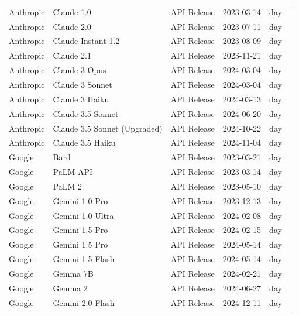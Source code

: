\documentclass[sigconf]{acmart}
\begin{document}
\begin{longtable}{p{2.2cm} p{3.4cm} p{3.0cm} p{2.3cm} p{1.6cm} p{2.0cm}}
Anthropic & Claude 1.0 & API Release & 2023-03-14 & day & \cite{anthropic_introducing_claude_2023} \\
Anthropic & Claude 2.0 & API Release & 2023-07-11 & day & \cite{anthropic_claude2_2023} \\
Anthropic & Claude Instant 1.2 & API Release & 2023-08-09 & day & \cite{anthropic_claude_instant_1_2_2023} \\
Anthropic & Claude 2.1 & API Release & 2023-11-21 & day & \cite{anthropic_claude2_1_2023} \\
Anthropic & Claude 3 Opus & API Release & 2024-03-04 & day & \cite{anthropic_claude3_family_2024} \\
Anthropic & Claude 3 Sonnet & API Release & 2024-03-04 & day & \cite{anthropic_claude3_family_2024} \\
Anthropic & Claude 3 Haiku & API Release & 2024-03-13 & day & \cite{anthropic_claude3_haiku_2024} \\
Anthropic & Claude 3.5 Sonnet & API Release & 2024-06-20 & day & \cite{anthropic_claude3_5_sonnet_2024} \\
Anthropic & Claude 3.5 Sonnet (Upgraded) & API Release & 2024-10-22 & day & \cite{anthropic_3_5_models_computer_use_2024} \\
Anthropic & Claude 3.5 Haiku & API Release & 2024-11-04 & day & \cite{anthropic_3_5_models_computer_use_2024} \\

Google & Bard & API Release & 2023-03-21 & day & \cite{google_bard_launch_2023} \\
Google & PaLM API & API Release & 2023-03-14 & day & \cite{google_palm_api_makersuite_2023} \\
Google & PaLM 2 & API Release & 2023-05-10 & day & \cite{google_palm2_2023} \\
Google & Gemini 1.0 Pro & API Release & 2023-12-13 & day & \cite{google_gemini_api_devs_2023} \\
Google & Gemini 1.0 Ultra & API Release & 2024-02-08 & day & \cite{google_gemini_next_era_2024} \\
Google & Gemini 1.5 Pro & API Release & 2024-02-15 & day & \cite{google_gemini_1_5_preview_2024} \\
Google & Gemini 1.5 Pro & API Release & 2024-05-14 & day & \cite{google_gemini_io_2024} \\
Google & Gemini 1.5 Flash & API Release & 2024-05-14 & day & \cite{google_gemini_io_2024} \\
Google & Gemma 7B & API Release & 2024-02-21 & day & \cite{google_gemma_open_models_2024} \\
Google & Gemma 2 & API Release & 2024-06-27 & day & \cite{google_gemma2_2024} \\
Google & Gemini 2.0 Flash & API Release & 2024-12-11 & day & \cite{deepmind_gemini_flash_2024} \\


\end{longtable}
\end{document}
